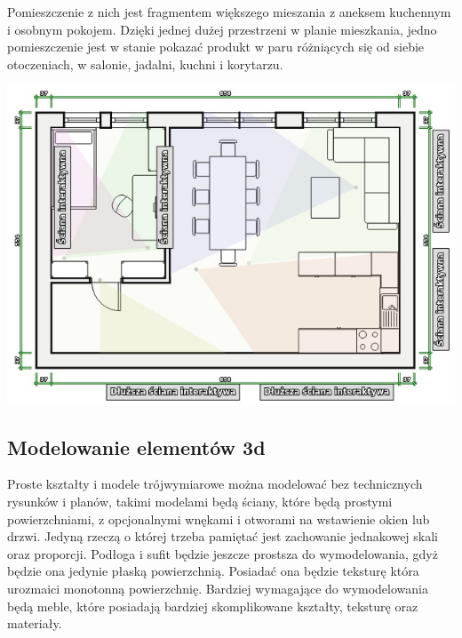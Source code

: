 \documentclass{article} %
\begin{document}
        Pomieszczenie z nich jest fragmentem większego mieszania z aneksem kuchennym i osobnym pokojem. Dzięki jednej dużej przestrzeni w planie mieszkania, jedno pomieszczenie jest w stanie pokazać produkt w paru różniących się od siebie otoczeniach, w salonie, jadalni, kuchni i korytarzu. 
        \\
        \begin{center}
            \includegraphics[scale=0.5]{images/diagrams/big_salon.jpeg}
        \end{center}
        
        
    \subsection{Modelowanie elementów 3d}
        Proste kształty i modele trójwymiarowe można modelować bez technicznych rysunków i planów, takimi modelami będą ściany, które będą prostymi powierzchniami, z opcjonalnymi wnękami i otworami na wstawienie okien lub drzwi. Jedyną rzeczą o której trzeba pamiętać jest zachowanie jednakowej skali oraz proporcji. Podłoga i sufit będzie jeszcze prostsza do wymodelowania, gdyż będzie ona jedynie płaską powierzchnią. Posiadać ona będzie teksturę która urozmaici monotonną powierzchnię.    Bardziej wymagające do wymodelowania będą meble, które posiadają bardziej skomplikowane kształty, teksturę oraz materiały. 
        \\
\end{document}
